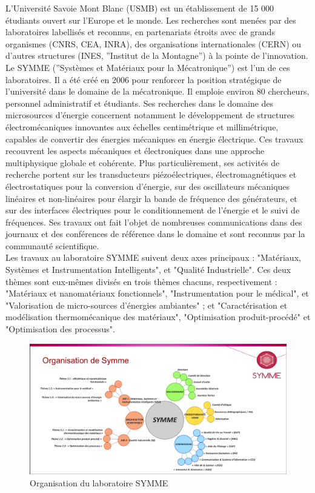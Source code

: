\documentclass[a4paper, french, 12pt, titlepage]{article}
\begin{document}
L’Université Savoie Mont Blanc (USMB) est un établissement de 15 000 étudiants ouvert sur l’Europe et le monde. Les recherches sont menées par des laboratoires labellisés et reconnus, en partenariats étroits avec de grands organismes (CNRS, CEA, INRA), des organisations internationales (CERN) ou d’autres structures (INES, ”Institut de la Montagne”) à la pointe de l’innovation. Le SYMME (”Systèmes et Matériaux pour la Mécatronique”) est l’un de ces laboratoires. Il a été créé en 2006 pour renforcer la position stratégique de l’université dans le domaine de la mécatronique. Il emploie environ 80 chercheurs, personnel administratif et étudiants. Ses recherches dans le domaine des microsources d’énergie concernent notamment le développement de structures électromécaniques innovantes aux échelles centimétrique et millimétrique, capables de convertir des énergies mécaniques en énergie électrique. Ces travaux recouvrent les aspects mécaniques et électroniques dans une approche multiphysique globale et cohérente. Plus particulièrement, ses activités de recherche portent sur les transducteurs piézoélectriques, électromagnétiques et électrostatiques pour la conversion d’énergie, sur des oscillateurs mécaniques linéaires et non-linéaires pour élargir la bande de fréquence des générateurs, et sur des interfaces électriques pour le conditionnement de l’énergie et le suivi de fréquences. Ses travaux ont fait l’objet de nombreuses communications dans des journaux et des conférences de référence dans le domaine et sont reconnus par la communauté scientifique.\\


Les travaux au laboratoire SYMME suivent deux axes principaux : "Matériaux, Systèmes et Instrumentation Intelligents", et "Qualité Industrielle". Ces deux thèmes sont eux-mêmes divisés en trois thèmes chacuns, respectivement : "Matériaux et nanomatériaux fonctionnels", "Instrumentation pour le médical", et "Valorisation de micro-sources d'énergies ambiantes" ; et "Caractérisation et modélisation thermomécanique des matériaux", "Optimisation produit-procédé" et "Optimisation des processus". \\

\begin{figure}[H]
  \includegraphics[width=\linewidth]{organigramme.png}
  \caption{Organisation du laboratoire SYMME}
  \label{fig:fig1}
\end{figure}
\end{document}
